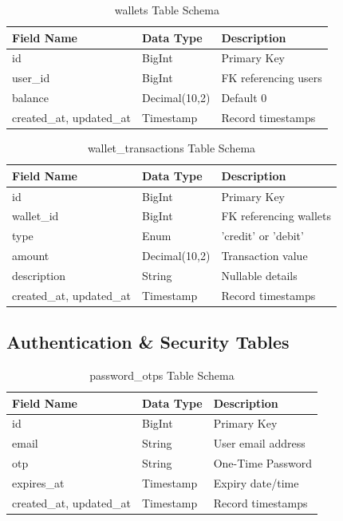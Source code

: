 \begin{longtable}{|l|l|p{7.5cm}|}
\caption{wallets Table Schema} \\
\hline
\textbf{Field Name} & \textbf{Data Type} & \textbf{Description} \\ \hline
id & BigInt & Primary Key \\ \hline
user\_id & BigInt & FK referencing users \\ \hline
balance & Decimal(10,2) & Default 0 \\ \hline
created\_at, updated\_at & Timestamp & Record timestamps \\ \hline
\end{longtable}

\begin{longtable}{|l|l|p{7.5cm}|}
\caption{wallet\_transactions Table Schema} \\
\hline
\textbf{Field Name} & \textbf{Data Type} & \textbf{Description} \\ \hline
id & BigInt & Primary Key \\ \hline
wallet\_id & BigInt & FK referencing wallets \\ \hline
type & Enum & 'credit' or 'debit' \\ \hline
amount & Decimal(10,2) & Transaction value \\ \hline
description & String & Nullable details \\ \hline
created\_at, updated\_at & Timestamp & Record timestamps \\ \hline
\end{longtable}

\subsection{Authentication \& Security Tables}
\begin{longtable}{|l|l|p{7.5cm}|}
\caption{password\_otps Table Schema} \\
\hline
\textbf{Field Name} & \textbf{Data Type} & \textbf{Description} \\ \hline
id & BigInt & Primary Key \\ \hline
email & String & User email address \\ \hline
otp & String & One-Time Password \\ \hline
expires\_at & Timestamp & Expiry date/time \\ \hline
created\_at, updated\_at & Timestamp & Record timestamps \\ \hline
\end{longtable}

